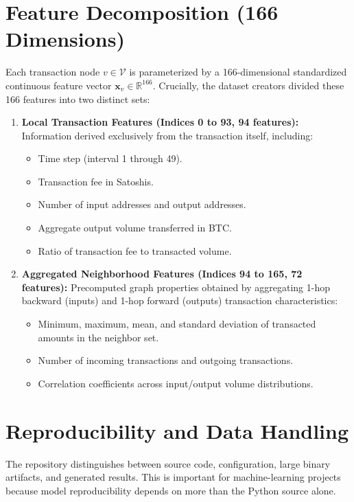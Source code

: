 \documentclass[11pt,a4paper]{report}
\begin{document}
\section{Feature Decomposition (166 Dimensions)}
Each transaction node $v \in \mathcal{V}$ is parameterized by a 166-dimensional standardized continuous feature vector $\mathbf{x}_v \in \mathbb{R}^{166}$. Crucially, the dataset creators divided these 166 features into two distinct sets:
\begin{enumerate}[leftmargin=1.5em]
  \item \textbf{Local Transaction Features (Indices 0 to 93, 94 features):}
  Information derived exclusively from the transaction itself, including:
  \begin{itemize}
    \item Time step (interval 1 through 49).
    \item Transaction fee in Satoshis.
    \item Number of input addresses and output addresses.
    \item Aggregate output volume transferred in BTC.
    \item Ratio of transaction fee to transacted volume.
  \end{itemize}
  \item \textbf{Aggregated Neighborhood Features (Indices 94 to 165, 72 features):}
  Precomputed graph properties obtained by aggregating 1-hop backward (inputs) and 1-hop forward (outputs) transaction characteristics:
  \begin{itemize}
    \item Minimum, maximum, mean, and standard deviation of transacted amounts in the neighbor set.
    \item Number of incoming transactions and outgoing transactions.
    \item Correlation coefficients across input/output volume distributions.
  \end{itemize}
\end{enumerate}


\section{Reproducibility and Data Handling}

The repository distinguishes between source code, configuration, large binary artifacts, and generated results. This is important for machine-learning projects because model reproducibility depends on more than the Python source alone.
\end{document}
